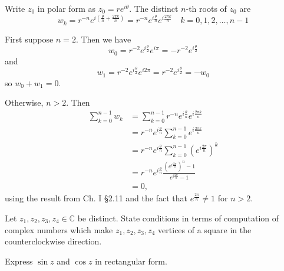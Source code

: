 \documentclass{article}
\newcounter{Problem}
\newenvironment{Problem}{\begin{Exercise}[name={Problem},
                                          counter={Problem}]}
                        {\end{Exercise}}
\begin{document}
\begin{Answer}
Write $z_0$ in polar form as $z_0 = r e^{i \theta}$. The
distinct $n$-th roots of $z_0$ are
$$
  w_k
= r^{-n} e^{i\left(\frac{\theta}{n} + \frac{2 \pi k}{n}\right)}
= r^{-n} e^{i \frac{\theta}{n}} e^{i \frac{2 \pi k}{n}}
\quad k = 0, 1, 2, \dots, n-1
$$

First suppose $n = 2$. Then we have
$$
w_0 = r^{-2} e^{i \frac{\theta}{2}} e^{i \pi} = -r^{-2} e^{i \frac{\theta}{2}}
$$
and
$$
w_1 = r^{-2} e^{i \frac{\theta}{2}} e^{i 2 \pi} = r^{-2} e^{i
  \frac{\theta}{2}} = -w_0
$$
so $w_0 + w_1 = 0$.

Otherwise, $n > 2$. Then
\begin{align*}
   \sum_{k = 0}^{n-1} w_k
&= \sum_{k=0}^{n-1} r^{-n} e^{i\frac{\theta}{n}} e^{i\frac{2 \pi k}{n}} \\
&= r^{-n} e^{i\frac{\theta}{n}} \sum_{k=0}^{n-1} e^{i\frac{2 \pi k}{n}} \\
&= r^{-n} e^{i\frac{\theta}{n}} \sum_{k=0}^{n-1} (e^{i\frac{2 \pi}{n}})^k \\
&= r^{-n} e^{i\frac{\theta}{n}} \frac{(e^{i\frac{2 \pi}{n}})^n -
  1}{e^{i \frac{2\pi}{n}} - 1} \\
&= 0,
\end{align*}
using the result from Ch. I \S 2.11 and the fact that
$e^{\frac{2 \pi}{n}} \neq 1$ for $n > 2$.
\end{Answer}

\begin{Problem}
Let $z_1, z_2, z_3, z_4 \in \mathbb{C}$ be distinct. State
conditions in terms of computation of complex numbers which make
$z_1, z_2, z_3, z_4$ vertices of a square in the counterclockwise
direction.
\end{Problem}

\begin{Problem}
Express $\sin z$ and $\cos z$ in rectangular form.
\end{Problem}
\end{document}
